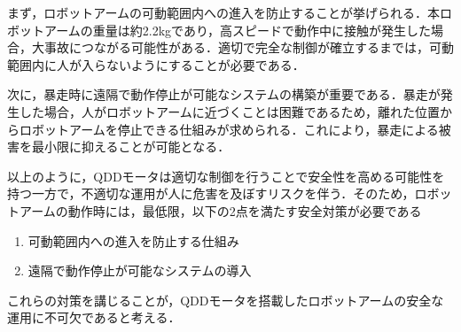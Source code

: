 まず，ロボットアームの可動範囲内への進入を防止することが挙げられる．本ロボットアームの重量は約2.2kgであり，高スピードで動作中に接触が発生した場合，大事故につながる可能性がある．適切で完全な制御が確立するまでは，可動範囲内に人が入らないようにすることが必要である．

次に，暴走時に遠隔で動作停止が可能なシステムの構築が重要である．暴走が発生した場合，人がロボットアームに近づくことは困難であるため，離れた位置からロボットアームを停止できる仕組みが求められる．これにより，暴走による被害を最小限に抑えることが可能となる．

以上のように，QDDモータは適切な制御を行うことで安全性を高める可能性を持つ一方で，不適切な運用が人に危害を及ぼすリスクを伴う．そのため，ロボットアームの動作時には，最低限，以下の2点を満たす安全対策が必要である

\begin{enumerate}
  \item 可動範囲内への進入を防止する仕組み
  \item 遠隔で動作停止が可能なシステムの導入
\end{enumerate}

これらの対策を講じることが，QDDモータを搭載したロボットアームの安全な運用に不可欠であると考える．